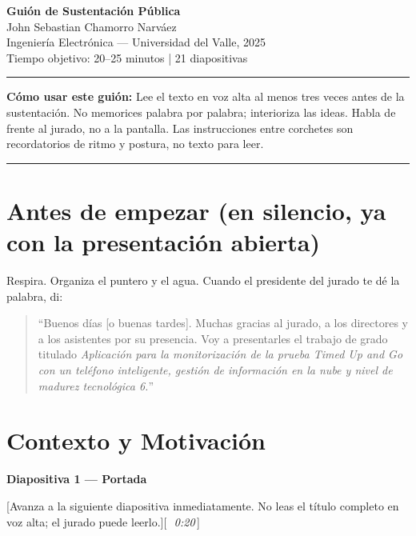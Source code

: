 \documentclass[12pt]{article}
\newcommand{\diap}[2]{%
  \begin{slidebox}
    \textbf{\color{slateblue}Diapositiva #1 — #2}
  \end{slidebox}%
}
\newcommand{\tiempo}[1]{\hfill{\small\color{timebox}[\,\textit{~#1}\,]}}
\begin{document}
\begin{center}
  {\Large\bfseries Guión de Sustentación Pública}\\[0.4em]
  {\large John Sebastian Chamorro Narváez}\\[0.3em]
  {\normalsize Ingeniería Electrónica — Universidad del Valle, 2025}\\[0.3em]
  {\small\color{slateblue}Tiempo objetivo: 20–25 minutos | 21 diapositivas}
\end{center}

\vspace{0.5em}\hrule\vspace{1em}

{\small\textbf{Cómo usar este guión:} Lee el texto en voz alta al menos tres veces antes de la sustentación. No memorices palabra por palabra; interioriza las ideas. Habla de frente al jurado, no a la pantalla. Las instrucciones entre corchetes son recordatorios de ritmo y postura, no texto para leer.}

\vspace{1em}\hrule\vspace{1em}

\section*{Antes de empezar (en silencio, ya con la presentación abierta)}

Respira. Organiza el puntero y el agua. Cuando el presidente del jurado te dé la palabra, di:

\begin{quote}
``Buenos días [o buenas tardes]. Muchas gracias al jurado, a los directores y a los asistentes por su presencia. Voy a presentarles el trabajo de grado titulado \emph{Aplicación para la monitorización de la prueba Timed Up and Go con un teléfono inteligente, gestión de información en la nube y nivel de madurez tecnológica 6.}''
\end{quote}

\section{Contexto y Motivación}

\diap{1}{Portada}
[Avanza a la siguiente diapositiva inmediatamente. No leas el título completo en voz alta; el jurado puede leerlo.]\tiempo{0:20}
\end{document}
